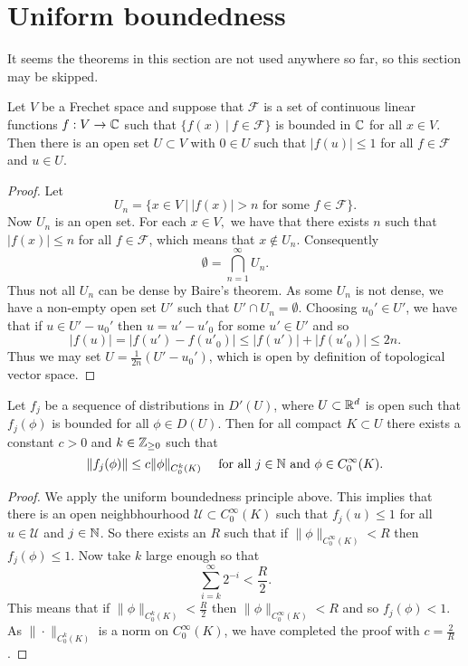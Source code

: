 \documentclass[twoside, a4paper, 10pt]{amsart}
\begin{document}
\iffalse
\section{Uniform boundedness}

It seems the theorems in this section are not used anywhere so far, so this section may be skipped.

\begin{thm} Let $V$ be a Frechet space and suppose that $\mathcal{F}$ is a set of continuous linear functions $f:V \to \mathbb{C}$ such that $\{ f(x) ~|~ f \in \mathcal{F} \}$ is bounded in $\mathbb{C}$ for all $x \in V$. Then there is an open set $U \subset V$ with $0 \in U$ such that $|f(u)| \leq 1$ for all $f \in \mathcal{F}$ and $u \in U$. \end{thm}


\begin{proof} Let $$U_n = \{ x \in V ~|~ |f(x)| > n \text{ for some } f \in \mathcal{F} \}.$$ Now $U_n$ is an open set. For each $x \in V,$ we have that there exists $n$ such that $|f(x)| \leq n$ for all $f \in \mathcal{F}$, which means that $x \notin U_n$. Consequently $$\emptyset = \bigcap_{n=1}^{\infty} U_n.$$ Thus not all $U_n$ can be dense by Baire's theorem. As some $U_n$ is not dense, we have a non-empty open set $U'$ such that $U' \cap U_n = \emptyset$. Choosing $u_0' \in U'$, we have that if $u \in U'-u_0'$ then $u = u'-u'_0$ for some $u' \in U'$ and so $$|f(u)| = |f(u') - f(u'_0)| \leq |f(u')| + |f(u'_0)| \leq 2n.$$ Thus we may set $U = \frac{1}{2n}(U'-u_0')$, which is open by definition of topological vector space. \end{proof}

\begin{thm} Let $f_j$ be a sequence of distributions in $D'(U)$, where $U \subset \mathbb{R}^d$ is open such that $f_j(\phi)$ is bounded for all $\phi \in D(U)$. Then for all compact $K \subset U$ there exists a constant $c>0$ and $k \in \mathbb{Z}_{\geq 0}$ such that $$\|f_j(\phi)\| \leq c \| \phi \|_{C_0^k(K)} \quad \text{ for all } j \in \mathbb{N} \text{ and } \phi \in C_0^{\infty}(K).$$

\end{thm}

\begin{proof} We apply the uniform boundedness principle above. This implies that there is an open neighbhourhood $\mathcal{U} \subset C_0^{\infty}(K)$ such that $f_j(u) \leq 1$ for all $u \in \mathcal{U}$ and $j \in \mathbb{N}$. So there exists an $R$ such that if $\| \phi \|_{C_0^{\infty}(K)} < R$ then $f_j(\phi) \leq 1$. Now take $k$ large enough so that $$\sum_{i=k}^{\infty} 2^{-i} < \frac{R}{2}.$$ This means that if $\|\phi \|_{C_0^{k}(K)} < \frac{R}{2}$ then $\| \phi \|_{C_0^{\infty}(K)} < R$ and so $f_j(\phi) < 1$. As $\|\cdot \|_{C_0^k(K)}$ is a norm on $C_0^{\infty}(K)$, we have completed the proof with $c= \frac{2}{R}$.  \end{proof}
\end{document}
